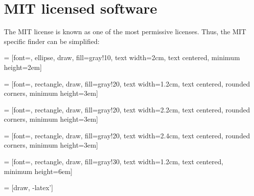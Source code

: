 %
%
%
%
%



\section{MIT licensed software}

The MIT license is known as one of the most permissive licenses. Thus, the
MIT specific finder can be simplified:

 = [font=\small, ellipse, draw, fill=gray!10, 
    text width=2cm, text centered, minimum height=2em]

 = [font=\footnotesize, rectangle, draw, fill=gray!20, 
    text width=1.2cm, text centered, rounded corners, minimum height=3em]

 = [font=\footnotesize, rectangle, draw, fill=gray!20, 
    text width=2.2cm, text centered, rounded corners, minimum height=3em]

 = [font=\footnotesize, rectangle, draw, fill=gray!20, 
    text width=2.4cm, text centered, rounded corners, minimum height=3em]
    
 = [font=\tiny, rectangle, draw, fill=gray!30, 
    text width=1.2cm, text centered, minimum height=6em]

 = [draw, -latex']

